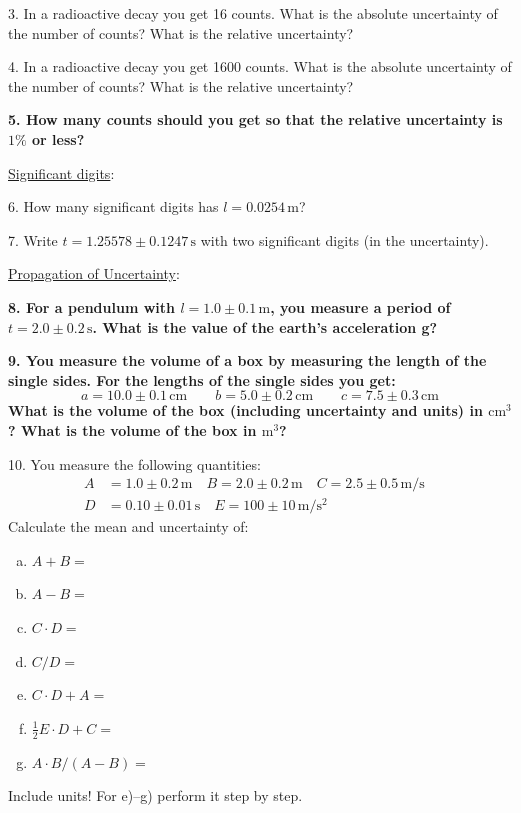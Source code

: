 3. In a radioactive decay you get 16 counts. What is the absolute uncertainty of the number of counts? What is the relative uncertainty? \myskip

4. In a radioactive decay you get 1600 counts. What is the absolute uncertainty of the number of counts? What is the relative uncertainty? \myskip

{\bf{5. How many counts should you get so that the relative uncertainty is $1\%$ or less? }}\myskip

\noindent \underline{Significant digits}: \myskip

6. How many significant digits has $l = 0.0254\,\mathrm{m}$? \myskip

7. Write $t = 1.25578 \pm 0.1247\,\mathrm{s}$ with two significant digits (in the uncertainty). \myskip

\noindent \underline{Propagation of Uncertainty}: \myskip

{\bf{8. For a pendulum with $l = 1.0 \pm 0.1\,\mathrm{m}$, you measure a period of $t = 2.0 \pm 0.2\,\mathrm{s}$. What is the value of the earth's acceleration g?}} \myskip

{\bf{9. You measure the volume of a box by measuring the length of the single sides. For the lengths of the single sides you get:
\begin{equation*}
    a = 10.0 \pm 0.1\,\mathrm{cm}\qquad    b = 5.0 \pm 0.2\,\mathrm{cm} \qquad c = 7.5 \pm 0.3\,\mathrm{cm}
\end{equation*}
What is the volume of the box (including uncertainty and units) in $\mathrm{cm}^3$? What is the volume of the box in $\mathrm{m}^3$? }}\myskip

10. You measure the following quantities:
\begin{align*}
    A &= 1.0 \pm 0.2\,\mathrm{m}\quad B = 2.0 \pm 0.2\,\mathrm{m}\quad        C = 2.5 \pm 0.5\,\mathrm{m/s} \\
    D &= 0.10\pm 0.01\,\mathrm{s}\quad E = 100\pm 10\,\mathrm{m/s^2} &
\end{align*}
Calculate the mean and uncertainty of:
\begin{enumerate}[a)]
    \item $A+B=$
    \item $A-B=$
    \item $C\cdot D=$
    \item $C/D=$
    \item $C\cdot D + A=$
    \item $\frac{1}{2}E\cdot D + C=$
    \item $A\cdot B/(A-B)=$
\end{enumerate}
Include units! For e)--g) perform it step by step.\myskip

